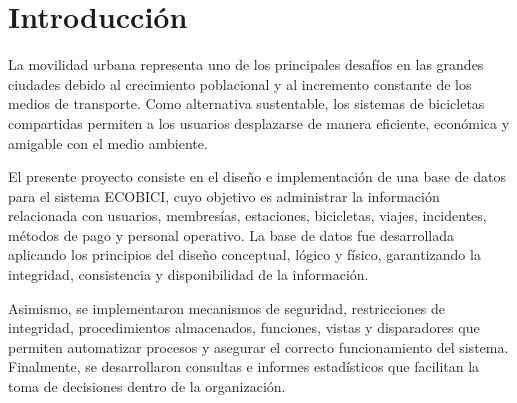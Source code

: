 \section{Introducción}

La movilidad urbana representa uno de los principales desafíos en las grandes ciudades debido al crecimiento poblacional y al incremento constante de los medios de transporte. Como alternativa sustentable, los sistemas de bicicletas compartidas permiten a los usuarios desplazarse de manera eficiente, económica y amigable con el medio ambiente.

El presente proyecto consiste en el diseño e implementación de una base de datos para el sistema ECOBICI, cuyo objetivo es administrar la información relacionada con usuarios, membresías, estaciones, bicicletas, viajes, incidentes, métodos de pago y personal operativo. La base de datos fue desarrollada aplicando los principios del diseño conceptual, lógico y físico, garantizando la integridad, consistencia y disponibilidad de la información.

Asimismo, se implementaron mecanismos de seguridad, restricciones de integridad, procedimientos almacenados, funciones, vistas y disparadores que permiten automatizar procesos y asegurar el correcto funcionamiento del sistema. Finalmente, se desarrollaron consultas e informes estadísticos que facilitan la toma de decisiones dentro de la organización.
